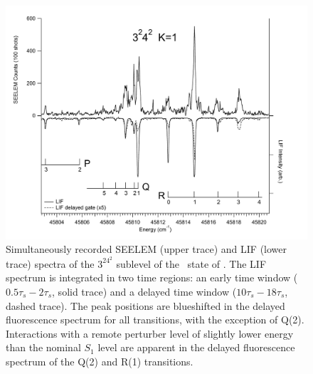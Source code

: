 \begin{figure}
  \caption{Simultaneously recorded SEELEM (upper trace) and LIF (lower
    trace) spectra of the $3^24^2$  sublevel of the \astate\
    state of .  The LIF spectrum is integrated in two time
    regions: an early time window ($0.5\tau_s-2\tau_s$, solid trace)
    and a delayed time window ($10\tau_s-18\tau_s$, dashed trace).
    The peak positions are blueshifted in the delayed fluorescence
    spectrum for all transitions, with the exception of Q(2).
    Interactions with a remote perturber level of slightly lower
    energy than the nominal $S_1$ level are apparent in the delayed
    fluorescence spectrum of the Q(2) and R(1) transitions.}
  \label{fig:spectrum-32b2}
  \centering
  \includegraphics[width=7in,angle=90]{spectrum-3242-p3r4.pdf}
\end{figure}

